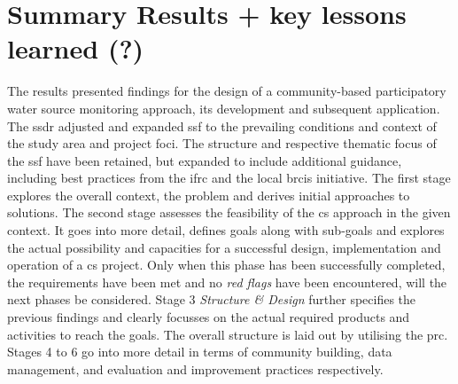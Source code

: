

\section{Summary Results + key lessons learned (?)}

The results presented findings for the design of a community-based participatory water source monitoring approach, its development and subsequent application. The \acrfull{ssdr} adjusted and expanded \autocite{fraislCitizenScienceEnvironmental2022} \acrlong{ssf} to the prevailing conditions and context of the study area and project foci. The structure and respective thematic focus of the \acrshort{ssf} have been retained, but expanded to include additional guidance, including best practices from the \acrshort{ifrc} and the local \acrshort{brcis} initiative. The first stage explores the overall context, the problem and derives initial approaches to solutions. The second stage assesses the feasibility of the \acrlong{cs} approach in the given context. It goes into more detail, defines goals along with sub-goals and explores the actual possibility and capacities for a successful design, implementation and operation of a \acrshort{cs} project. Only when this phase has been successfully completed, the requirements have been met and no \textit{red flags} have been encountered, will the next phases be considered. Stage 3 \textit{Structure \& Design} further specifies the previous findings and clearly focusses on the actual required products and activities to reach the goals. The overall structure is laid out by utilising the \acrfull{prc}. Stages 4 to 6 go into more detail in terms of community building, data management, and evaluation and improvement practices respectively.\newline
